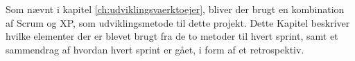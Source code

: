 Som nævnt i kapitel \ref{ch:udviklingsvaerktoejer}, bliver der brugt en kombination af Scrum og XP, 
som udviklingsmetode til dette projekt. Dette  Kapitel beskriver hvilke elementer der er blevet brugt fra de
to metoder til hvert sprint, samt et sammendrag af hvordan hvert sprint er gået, i form af et retrospektiv.